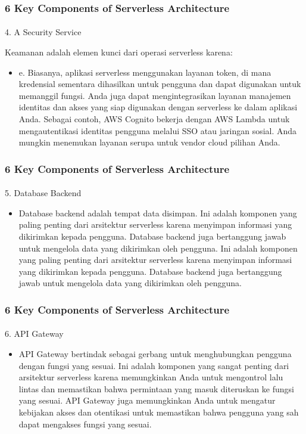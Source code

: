 \documentclass[aspectratio=169, table]{beamer}
\begin{document}
	\begin{frame}\frametitle{6 Key Components of Serverless Architecture}
			\framesubtitle{\hspace{1cm}}
		4. A Security Service

		Keamanan adalah elemen kunci dari operasi serverless karena:
		\begin{itemize}


			\item e. Biasanya, aplikasi serverless menggunakan layanan token, di mana kredensial sementara dihasilkan untuk pengguna dan dapat digunakan untuk memanggil fungsi. Anda juga dapat mengintegrasikan layanan manajemen identitas dan akses yang siap digunakan dengan serverless ke dalam aplikasi Anda. Sebagai contoh, AWS Cognito bekerja dengan AWS Lambda untuk mengautentikasi identitas pengguna melalui SSO atau jaringan sosial. Anda mungkin menemukan layanan serupa untuk vendor cloud pilihan Anda.
		\end{itemize}
	\end{frame}

	\begin{frame}\frametitle{6 Key Components of Serverless Architecture}
			\framesubtitle{\hspace{1cm}}
		5. Database Backend
		\begin{itemize}
			\item Database backend adalah tempat data disimpan. Ini adalah komponen yang paling penting dari arsitektur serverless karena menyimpan informasi yang dikirimkan kepada pengguna.
			Database backend juga bertanggung jawab untuk mengelola data yang dikirimkan oleh pengguna.
			Ini adalah komponen yang paling penting dari arsitektur serverless karena menyimpan informasi yang dikirimkan kepada pengguna.
			Database backend juga bertanggung jawab untuk mengelola data yang dikirimkan oleh pengguna.
		\end{itemize}
	\end{frame}

	\begin{frame}\frametitle{6 Key Components of Serverless Architecture}
			\framesubtitle{\hspace{1cm}}
		6. API Gateway
		\begin{itemize}
			\item API Gateway bertindak sebagai gerbang untuk menghubungkan pengguna dengan fungsi yang sesuai.
			Ini adalah komponen yang sangat penting dari arsitektur serverless karena memungkinkan Anda untuk mengontrol lalu lintas dan memastikan bahwa permintaan yang masuk diteruskan ke fungsi yang sesuai.
			API Gateway juga memungkinkan Anda untuk mengatur kebijakan akses dan otentikasi untuk memastikan bahwa pengguna yang sah dapat mengakses fungsi yang sesuai.
		\end{itemize}
	\end{frame}
\end{document}
